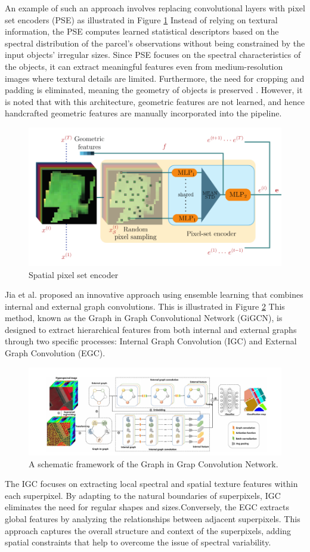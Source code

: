 An example of such an approach involves replacing convolutional layers with pixel set encoders (PSE) as illustrated in Figure  \ref{fig:PSE} Instead of relying on textural information, the PSE computes learned statistical descriptors based on the spectral distribution of the parcel’s observations without being constrained by the input objects' irregular sizes. Since PSE focuses on the spectral characteristics of the objects, it can extract meaningful features even from medium-resolution images where textural details are limited. Furthermore, the need for cropping and padding is eliminated, meaning the geometry of objects is preserved \cite{garnot_satellite_2020}. However, it is noted that with this architecture, geometric features are not learned, and hence handcrafted geometric features are manually incorporated into the pipeline.
\begin{figure}[h]
    \centering
    \includegraphics[width=0.5\linewidth]{images/how_psetae_works-ga667c28f-d2af-349e-3181-6390db8c0580.png}
    \caption{Spatial pixel set encoder\cite{garnot_satellite_2020}}
    \label{fig:PSE}
\end{figure}

Jia et al. \cite{jia_graph--graph_2024} proposed an innovative approach using ensemble learning that combines internal and external graph convolutions. This is illustrated in Figure \ref{fig:GIGCN} This method, known as the Graph in Graph Convolutional Network (GiGCN), is designed to extract hierarchical features from both internal and external graphs through two specific processes: Internal Graph Convolution (IGC) and External Graph Convolution (EGC).

\begin{figure}[h]
    \centering
    \includegraphics[width=1\linewidth]{images/GIGCN.PNG}
    \caption{A schematic framework of the Graph in Grap Convolution Network\cite{jia_graph--graph_2024}.}
    \label{fig:GIGCN}
\end{figure}
The IGC focuses on extracting local spectral and spatial texture features within each superpixel. By adapting to the natural boundaries of superpixels, IGC eliminates the need for regular shapes and sizes.Conversely, the EGC extracts global features by analyzing the relationships between adjacent superpixels. This approach captures the overall structure and context of the superpixels, adding spatial constraints that help to overcome the issue of spectral variability.

